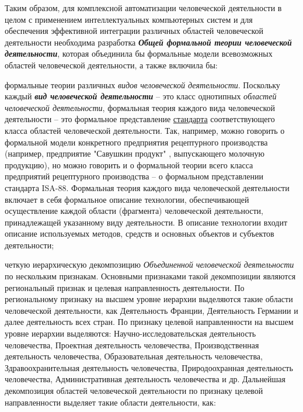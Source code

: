 {Таким образом, для комплексной автоматизации человеческой деятельности в целом с применением интеллектуальных компьютерных систем и для обеспечения эффективной интеграции различных областей человеческой деятельности необходима разработка \textbf{\textit{Общей формальной теории человеческой деятельности}}, которая объединила бы формальные модели всевозможных областей человеческой деятельности, а также включила бы:
\begin{scnitemize}
    \item формальные теории различных \textit{видов человеческой деятельности}. Поскольку каждый \textbf{\textit{вид человеческой деятельности}} -- это класс однотипных \textit{областей человеческой деятельности}, формальная теория каждого вида человеческой деятельности -- это формальное представление \underline{стандарта} соответствующего класса областей человеческой деятельности. Так, например, можно говорить о формальной модели конкретного предприятия рецептурного производства (например, предприятие "Савушкин продукт"{} , выпускающего молочную продукцию), но можно говорить и о формальной теории всего класса предприятий рецептурного производства -- о формальном представлении стандарта ISA-88. Формальная теория каждого вида человеческой деятельности включает в себя формальное описание технологии, обеспечивающей осуществление каждой области (фрагмента) человеческой деятельности, принадлежащей указанному виду деятельности. В описание технологии входит описание используемых методов, средств и основных объектов и субъектов деятельности;
    \item четкую иерархическую декомпозицию \textit{Объединенной человеческой деятельности} по нескольким признакам. Основными признаками такой декомпозиции являются региональный признак и целевая направленность деятельности. По региональному признаку на высшем уровне иерархии выделяются такие области человеческой деятельности, как Деятельность Франции, Деятельность Германии и далее деятельность всех стран. По признаку целевой направленности на высшем уровне иерархии выделяются: Научно-исследовательская деятельность человечества, Проектная деятельность человечества, Производственная деятельность человечества, Образовательная деятельность человечества, Здравоохранительная деятельность человечества, Природоохранная деятельность человечества, Административная деятельность человечества и др. Дальнейшая декомпозиция областей человеческой деятельности по признаку целевой направленности выделяет такие области деятельности, как:
    \begin{scnitemizeii}

\end{scnitemizeii}
\end{scnitemize}}
